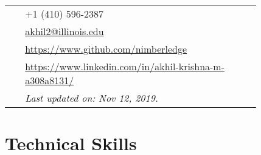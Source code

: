 \documentclass[10pt, oneside]{article} %
\begin{document}
\begin{paracol}{2}
\parbox[top][0.12\textheight][c]{\linewidth}{ %
	\vspace{-0.04\textheight} %
	\colorbox{shade}{ %
		\begin{supertabular}{p{0.05\linewidth}|p{0.775\linewidth}} %
			\raisebox{-1pt}{\faPhone} & +1 (410) 596-2387 \\ %
			\raisebox{0pt}{\small\faEnvelope} & \href{mailto:akhil2@illinois.edu}{akhil2@illinois.edu} \\ %
			\raisebox{-1pt}{\faGithub} & \href{https://www.github.com/nimberledge}{https://www.github.com/nimberledge} \\ %
			\raisebox{-1pt}{\faLinkedinSquare} & \href{https://www.linkedin.com/in/akhil-krishna-m-a308a8131/}{https://www.linkedin.com/in/akhil-krishna-m-a308a8131/} \\ %
			\raisebox{-1pt}{} & \textit{Last updated on: Nov 12, 2019.}\\
		\end{supertabular}
	}
}



\section{Technical Skills} 






\end{paracol}
\end{document}
